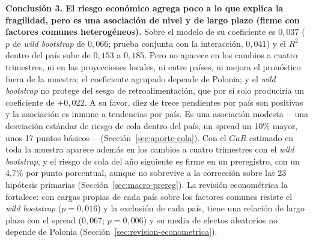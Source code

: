 \textbf{Conclusión 3. El riesgo económico agrega poco a lo que explica la fragilidad, pero es una asociación de nivel y de largo plazo (firme con factores comunes heterogéneos).} Sobre el modelo de \citet{Chari2024b} su coeficiente es $0{,}037$ ($p$ de \textit{wild bootstrap} de $0{,}066$; prueba conjunta con la interacción, $0{,}041$) y el $R^2$ dentro del país sube de $0{,}153$ a $0{,}185$. Pero no aparece en los cambios a cuatro trimestres, ni en las proyecciones locales, ni entre países, ni mejora el pronóstico fuera de la muestra; el coeficiente agrupado depende de Polonia; y el \textit{wild bootstrap} no protege del sesgo de retroalimentación, que por sí solo produciría un coeficiente de $+0{,}022$. A su favor, diez de trece pendientes por país son positivas y la asociación es inmune a tendencias por país. Es una asociación modesta ---una desviación estándar de riesgo de cola dentro del país, un spread un 10\% mayor, unos 17 puntos básicos--- (Sección~\ref{sec:aporte-cola}). Con el $GaR$ estimado en toda la muestra aparece además en los cambios a cuatro trimestres con el \textit{wild bootstrap}, y el riesgo de cola del año siguiente es firme en un preregistro, con un 4,7\% por punto porcentual, aunque no sobrevive a la corrección sobre las 23 hipótesis primarias (Sección~\ref{sec:macro-prereg}). La revisión econométrica la fortalece: con cargas propias de cada país sobre los factores comunes resiste el \textit{wild bootstrap} ($p=0{,}016$) y la exclusión de cada país, tiene una relación de largo plazo con el spread ($0{,}067$; $p=0{,}006$) y su media de efectos aleatorios no depende de Polonia (Sección~\ref{sec:revision-econometrica}).

